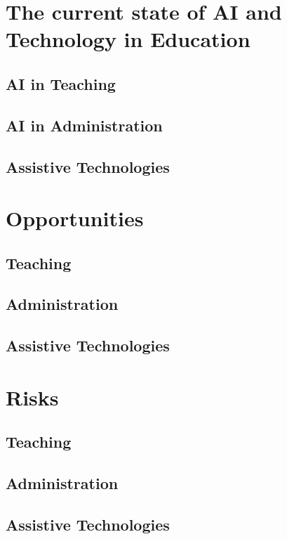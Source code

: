 \documentclass{Academic}
\begin{document}
    \section{The current state of AI and Technology in Education}

    \subsection{AI in Teaching}

    \subsection{AI in Administration}

    \subsection{Assistive Technologies}

    \section{Opportunities}

    \subsection{Teaching}

    \subsection{Administration}

    \subsection{Assistive Technologies}

    \section{Risks}

    \subsection{Teaching}

    \subsection{Administration}

    \subsection{Assistive Technologies}
\end{document}
